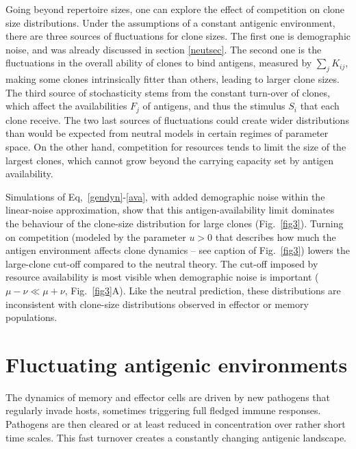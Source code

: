 \documentclass[aps,pre,twocolumn,superscriptaddress,groupedaddress]{revtex4}
\newcommand{\<}{\langle}
\renewcommand{\>}{\rangle}
\begin{document}
Going beyond repertoire sizes, one can explore the effect of competition on clone size distributions. Under the assumptions of a constant antigenic environment, there are three sources of fluctuations for clone sizes. The first one is demographic noise, and was already discussed in section \ref{neutsec}. The second one is the fluctuations in the overall ability of clones to bind antigens, measured by $\sum_j K_{ij}$, making some clones intrinsically fitter than others, leading to larger clone sizes. The third source of stochasticity stems from the constant turn-over of clones, which affect the availabilities $F_j$ of antigens, and thus the stimulus $S_i$ that each clone receive. The two last sources of fluctuations could create wider distributions than would be expected from neutral models in certain regimes of parameter space. On the other hand, competition for resources tends to limit the size of the largest clones, which cannot grow beyond the carrying capacity set by antigen availability.

Simulations of Eq,~\ref{gendyn}-\ref{ava}, with added demographic noise within the linear-noise approximation, show that this antigen-availability limit dominates the behaviour of the clone-size distribution for large clones (Fig.~\ref{fig3}). Turning on competition (modeled by the parameter $u>0$ that describes how much the antigen environment affects clone dynamics -- see caption of Fig.~\ref{fig3}) lowers
the large-clone cut-off compared to the neutral theory. The cut-off imposed by resource availability is most visible when demographic noise is important ($\mu - \nu \ll \mu+\nu$, Fig.~\ref{fig3}A).
Like the neutral prediction, these distributions are inconsistent with clone-size distributions observed in effector or memory populations.

 \section{Fluctuating antigenic environments}
 \label{flusec}
 
The dynamics of memory and effector cells are driven by
new pathogens that regularly invade hosts, sometimes triggering full fledged immune responses. Pathogens are then cleared or at least reduced in concentration over rather short time scales. This fast turnover creates a constantly changing antigenic landscape.
\end{document}
